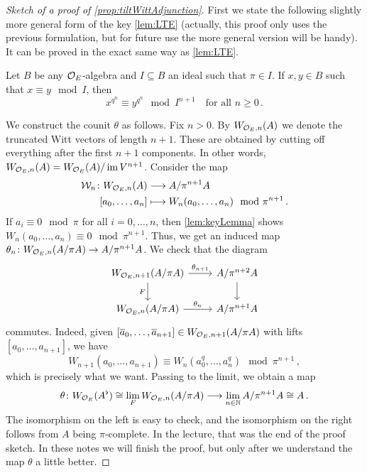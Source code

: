 \documentclass[a4paper, 10pt, oneside, DIV=9, chapterprefix=true, numbers=enddot,bibliography=totoc]{scrbook}
\begin{document}
\begin{proof}[Sketch of a proof of \cref{prop:tiltWittAdjunction}]
	First we state the following slightly more general form of the key \cref{lem:LTE} (actually, this proof only uses the previous formulation, but for future use the more general version will be handy). It can be proved in the exact same way as \cref{lem:LTE}.
	\begin{lem}\label{lem:keyLemma}
		Let $B$ be any $\mathcal{O}_E$-algebra and $I\subseteq B$ an ideal such that $\pi\in I$. If $x,y\in B$ such that $x\equiv y\mod I$, then
		\begin{equation*}
			x^{q^n}\equiv y^{q^n}\mod I^{n+1}\quad\text{for all }n\geq 0\,.
		\end{equation*}
	\end{lem}
	We construct the counit $\theta$ as follows. Fix $n>0$. By $W_{\mathcal{O}_E,n}(A)$ we denote the truncated Witt vectors of length $n+1$. These are obtained by cutting off everything after the first $n+1$ components. In other words, $W_{\mathcal{O}_E,n}(A)=W_{\mathcal{O}_E}(A)/\operatorname{im} V^{n+1}$. Consider the map
	\begin{align*}
		\Ww_n\colon W_{\Oo_E,n}(A)&\morphism A/\pi^{n+1}A\\
		[a_0,\dotsc,a_n]&\longmapsto W_n(a_0,\dotsc,a_n)\mod \pi^{n+1}\,.
	\end{align*}
	If $a_i\equiv 0\mod \pi$ for all $i=0,\dotsc,n$, then \cref{lem:keyLemma} shows $W_n(a_0,\dotsc,a_n)\equiv 0\mod \pi^ {n+1}$. Thus, we get an induced map $\theta_n\colon W_{\Oo_E,n}(A/\pi A)\morphism A/\pi^{n+1}A$. We check that the diagram
	\begin{equation*}
		\begin{tikzcd}
			W_{\Oo_E,n+1}(A/\pi A)\dar["F"{swap}]\rar["\theta_{n+1}"] & A/\pi^{n+2}A\dar\\
			W_{\Oo_E,n}(A/\pi A)\rar["\theta_n"] & A/\pi^{n+1}A
		\end{tikzcd}
	\end{equation*}
	commutes. Indeed, given $[\ov{a}_0,\dotsc,\ov{a}_{n+1}]\in W_{\Oo_E,n+1}(A/\pi A)$ with lifts $[a_0,\dotsc,a_{n+1}]$, we have
	\begin{equation*}
		W_{n+1}(a_0,\dotsc,a_{n+1})\equiv W_n(a_0^q,\dotsc,a_n^q)\mod \pi^{n+1}\,,
	\end{equation*}
	which is precisely what we want. Passing to the limit, we obtain a map
	\begin{equation*}
		\theta\colon W_{\Oo_E}(A^\flat)\cong \lim_FW_{\Oo_E,n}(A/\pi A)\morphism \lim_{n \in\IN}A/\pi^{n+1}A\cong A\,.
	\end{equation*}
	The isomorphism on the left is easy to check, and the isomorphism on the right follows from $A$ being $\pi$-complete. In the lecture, that was the end of the proof sketch. In these notes we will finish the proof, but only after we understand the map $\theta$ a little better.
\end{proof}
\end{document}
